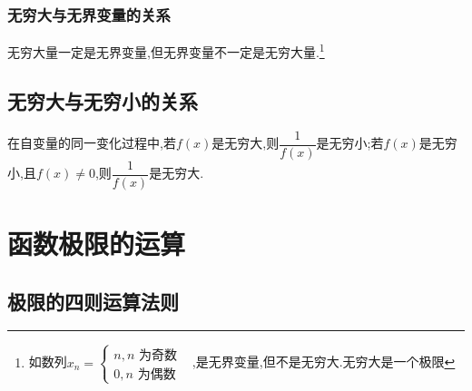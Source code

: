 \documentclass[8pt a4paper, oneside, UTF8]{ctexbook}
\begin{document}
\begin{sloppypar}
    \subsubsection{无穷大与无界变量的关系}
    无穷大量一定是无界变量,但无界变量不一定是无穷大量.\footnote{如数列$x_n=\begin{cases}n,n\text{ 为奇数}\\0,n\text{ 为偶数}&\end{cases}$,是无界变量,但不是无穷大.无穷大是一个极限}
    \subsection{无穷大与无穷小的关系}
    在自变量的同一变化过程中,若$f(x)$是无穷大,则$\dfrac{1}{f(x)}$是无穷小;若$f(x)$是无穷小,且$f(x)\neq 0$,则$\dfrac{1}{f(x)}$是无穷大.
    \section{函数极限的运算}
    \subsection{极限的四则运算法则}\label{jxdsz1}

\end{sloppypar}
\end{document}
